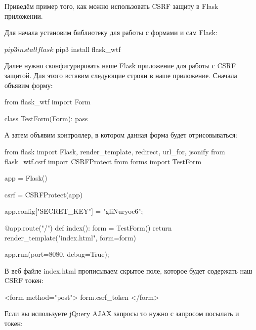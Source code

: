 Приведём пример того, как можно использовать CSRF защиту в Flask 
приложении.

Для начала установим библиотеку для работы с формами и сам Flask:

\begin{python}
$ pip3 install flask
$ pip3 install flask_wtf
\end{python}

Далее нужно сконфигурировать наше Flask приложение для работы с CSRF
защитой. Для этого вставим следующие строки в наше приложение. Сначала
объявим форму:

\begin{python}
from flask_wtf import Form

class TestForm(Form):
	pass
\end{python}

А затем объявим контроллер, в котором данная форма будет отрисовываться:

\begin{python}
from flask import Flask, render_template, redirect, url_for, jsonify
from flask_wtf.csrf import CSRFProtect
from forms import TestForm

app = Flask()

csrf = CSRFProtect(app)

app.config["SECRET_KEY"] = "gliNuryoc6";

@app.route("/")
def index():
    form = TestForm()
    return render_template("index.html", form=form)

app.run(port=8080, debug=True);
\end{python}

В веб файле index.html прописываем скрытое поле, которое будет содержать наш CSRF токен:

\begin{python}
<form method="post">
    {{ form.csrf_token }}
</form>
\end{python}

Если вы используете jQuery AJAX запросы то нужно с запросом посылать и
токен:


